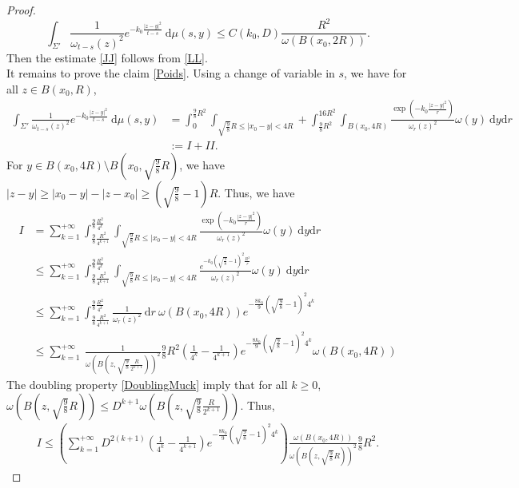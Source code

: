 \documentclass[10pt,a4paper]{amsart}
\begin{document}
\begin{proof}
\begin{equation}
    \int_{\Sigma'} \frac{1}{\omega_{t-s}(z)^2} e ^{-k_0 \frac{\left | z-y \right |^2}{t-s}} \ \mathrm d\mu(s,y) \leq C(k_0,D) \frac{R^2}{\omega(B(x_0,2R))}.
\end{equation}
Then the estimate \eqref{JJ} follows from \eqref{LL}.\\
It remains to prove the claim \eqref{Poids}. Using a change of variable in $s$, we have for all $z \in B(x_0,R)$,
\begin{align*}
    \int_{\Sigma'} \frac{1}{\omega_{t-s}(z)^2} e ^{-k_0 \frac{\left | z-y \right |^2}{t-s}} \ \mathrm d\mu(s,y) &= \int_{0}^{\frac{9}{8}R^2}\int_{\sqrt{\frac{9}{8}}R\leq \left |x_0- y \right |<4R} + \int_{\frac{9}{8}R^2}^{16R^2}\int_{B(x_0,4R)} \frac{\exp(-k_0 \frac{\left |z- y \right |^2}{r})}{\omega_r(z)^2} \omega(y)\ \mathrm dy \mathrm d r \\&:= I +II.
\end{align*}
For $y \in B(x_0,4R)\setminus B(x_0,\sqrt{\frac{9}{8}}R)$, we have $\left | z-y \right | \ge \left | x_0-y \right |-\left | z-x_0 \right | \ge (\sqrt{\frac{9}{8}}-1)R$. Thus, we have
\begin{align*}
    I&= \sum_{k=1}^{+\infty} \int_{ \frac{9}{8}\frac{R^2}{4^{k+1}}}^{ \frac{9}{8}\frac{R^2}{4^k}}\int_{\sqrt{\frac{9}{8}}R\leq \left |x_0- y \right |<4R}  \frac{\exp(-k_0 \frac{\left | z-y \right |^2}{r})}{\omega_r(z)^2} \omega(y)\ \mathrm dy \mathrm d r
    \\&  \leq \sum_{k=1}^{+\infty} \int_{ \frac{9}{8}\frac{R^2}{4^{k+1}}}^{ \frac{9}{8}\frac{R^2}{4^k}}\int_{\sqrt{\frac{9}{8}}R\leq \left |x_0- y \right |<4R}  \frac{e^{-k_0 \left ( \sqrt{\frac{9}{8}}-1 \right )^2\frac{R^2}{r}}}{\omega_r(z)^2} \omega(y)\ \mathrm dy \mathrm d r
    \\& \leq \sum_{k=1}^{+\infty} \int_{ \frac{9}{8}\frac{R^2}{4^{k+1}}}^{ \frac{9}{8}\frac{R^2}{4^k}} \frac{1}{\omega_r(z)^2} \ \mathrm dr \ \omega(B(x_0,4R)) e^{-\frac{8k_0}{9}\left ( \sqrt{\frac{9}{8}}-1 \right )^2 4^k} 
    \\& \leq \sum_{k=1}^{+\infty} \ \frac{1}{\omega(B(z,\sqrt{\frac{9}{8}}\frac{R}{2^{k+1}}))^2} \frac{9}{8}R^2  \left ( \frac{1}{4^k}- \frac{1}{4^{k+1}} \right ) e^{-\frac{8k_0}{9}\left ( \sqrt{\frac{9}{8}}-1 \right )^2 4^k} \omega(B(x_0,4R))
\end{align*}
The doubling property \eqref{DoublingMuck} imply that for all $k\ge0$, $\omega(B(z,\sqrt{\frac{9}{8}}R)) \leq D^{k+1}\omega(B(z,\sqrt{\frac{9}{8}}\frac{R}{2^{k+1}}))$. Thus,
\begin{align*}
    I\leq \left (  \sum_{k=1}^{+\infty} D^{2(k+1)} \left ( \frac{1}{4^k}- \frac{1}{4^{k+1}} \right ) e^{-\frac{8k_0}{9}\left ( \sqrt{\frac{9}{8}}-1 \right )^2 4^k}\right )  \frac{\omega(B(x_0,4R))}{\omega(B(z,\sqrt{\frac{9}{8}}R))^2} \frac{9}{8} R^2.

\end{align*}
\end{proof}
\end{document}
